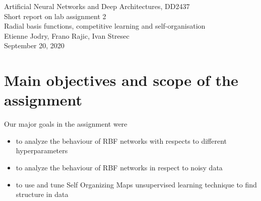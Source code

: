 \documentclass[a4paper]{article}
\begin{document}
\begin{center}
  {\large Artificial Neural Networks and Deep Architectures, DD2437}\\
  \vspace{7mm}
  {\huge Short report on lab assignment 2\\[1ex]}
  {\Large Radial basis functions, competitive learning and self-organisation}\\
  \vspace{8mm}  
  {\Large Etienne Jodry, Frano Rajic, Ivan Stresec\\}
  \vspace{4mm}
  {\large September 20, 2020\\}
\end{center}


\section{Main objectives and scope of the assignment}

Our major goals in the assignment were  
\begin{itemize}
\item to analyze the behaviour of RBF networks with respects to different hyperparameters
\item to analyze the behaviour of RBF networks in respect to noisy data
\item to use and tune Self Organizing Maps unsupervised learning technique to find structure in data
\end{itemize}
\end{document}
